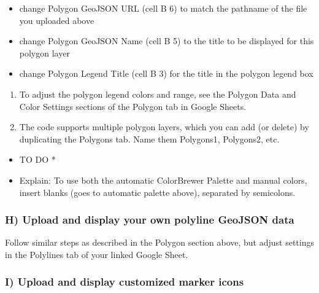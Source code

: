 \documentclass[
  english,
]{book}
\providecommand{\tightlist}{%
  \setlength{\itemsep}{0pt}\setlength{\parskip}{0pt}}
\begin{document}
\begin{itemize}
\tightlist
\item
  change Polygon GeoJSON URL (cell B 6) to match the pathname of the file you uploaded above
\item
  change Polygon GeoJSON Name (cell B 5) to the title to be displayed for this polygon layer
\item
  change Polygon Legend Title (cell B 3) for the title in the polygon legend box
\end{itemize}

\begin{enumerate}
\def\labelenumi{\arabic{enumi})}
\setcounter{enumi}{3}
\item
  To adjust the polygon legend colors and range, see the Polygon Data and Color Settings sections of the Polygon tab in Google Sheets.
\item
  The code supports multiple polygon layers, which you can add (or delete) by duplicating the Polygons tab. Name them Polygons1, Polygons2, etc.
\end{enumerate}

\begin{itemize}
\tightlist
\item
  TO DO *
\item
  Explain: To use both the automatic ColorBrewer Palette and manual colors, insert blanks (goes to automatic palette above), separated by semicolons.
\end{itemize}

\hypertarget{h-upload-and-display-your-own-polyline-geojson-data}{%
\subsubsection*{H) Upload and display your own polyline GeoJSON data}\label{h-upload-and-display-your-own-polyline-geojson-data}}

Follow similar steps as described in the Polygon section above, but adjust settings in the Polylines tab of your linked Google Sheet.

\hypertarget{i-upload-and-display-customized-marker-icons}{%
\subsubsection*{I) Upload and display customized marker icons}\label{i-upload-and-display-customized-marker-icons}}
\end{document}
